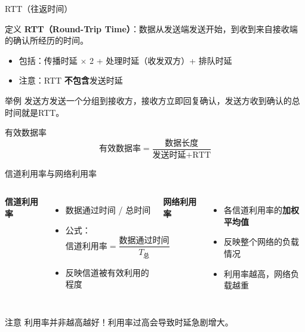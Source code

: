 \documentclass[10pt, aspectratio=169]{beamer}
\begin{document}
\begin{frame}{RTT（往返时间）}
    \begin{block}{定义}
        \textbf{RTT（Round-Trip Time）}：数据从发送端发送开始，到收到来自接收端的确认所经历的时间。
    \end{block}
    \vspace{0.5em}
    \begin{itemize}
        \item 包括：传播时延 $\times$ 2 + 处理时延（收发双方）+ 排队时延
        \item 注意：RTT \textbf{不包含}发送时延
    \end{itemize}
    \vspace{0.5em}
    \begin{exampleblock}{举例}
        发送方发送一个分组到接收方，接收方立即回复确认，发送方收到确认的总时间就是RTT。
    \end{exampleblock}
    \vspace{0.3em}
    \begin{block}{有效数据率}
        $$\text{有效数据率} = \frac{\text{数据长度}}{\text{发送时延} + \text{RTT}}$$
    \end{block}
\end{frame}

\begin{frame}{信道利用率与网络利用率}
    \begin{columns}[T]
        \textbf{信道利用率}
        \begin{itemize}
            \item 数据通过时间 / 总时间
            \item 公式：
            $$\text{信道利用率} = \frac{\text{数据通过时间}}{T_{\text{总}}}$$
            \item 反映信道被有效利用的程度
        \end{itemize}
        \textbf{网络利用率}
        \begin{itemize}
            \item 各信道利用率的\textbf{加权平均值}
            \item 反映整个网络的负载情况
            \item 利用率越高，网络负载越重
        \end{itemize}
    \end{columns}
    \vspace{0.5em}
    \begin{alertblock}{注意}
        利用率并非越高越好！利用率过高会导致时延急剧增大。
    \end{alertblock}
\end{frame}
\end{document}
